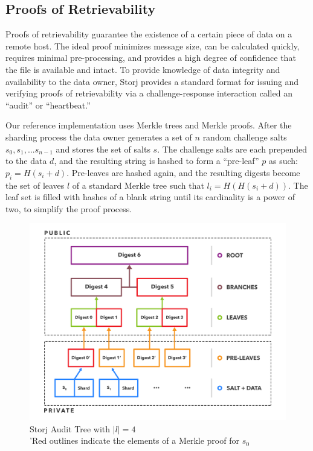\documentclass[a4paper,10pt]{article}
\begin{document}
\subsection{Proofs of Retrievability}
Proofs of retrievability guarantee the existence of a certain piece of data on a remote host. The ideal proof minimizes message size, can be calculated quickly, requires minimal pre-processing, and provides a high degree of confidence that the file is available and intact. To provide knowledge of data integrity and availability to the data owner, Storj provides a standard format for issuing and verifying proofs of retrievability via a challenge-response interaction called an “audit” or “heartbeat.”

Our reference implementation uses Merkle trees \cite{5} and Merkle proofs. After the sharding process the data owner generates a set of $ n $ random challenge salts $ s_{0}, s_{1}, ... s_{n-1} $ and stores the set of salts $ s $. The challenge salts are each prepended to the data $ d $, and the resulting string is hashed to form a “pre-leaf” $ p $ as such: $ p_{i} = H(s_{i} + d) $. Pre-leaves are hashed again, and the resulting digests become the set of leaves $ l $ of a standard Merkle tree such that $ l_{i} = H(H(s_{i} + d)) $. The leaf set is filled with hashes of a blank string until its cardinality is a power of two, to simplify the proof process.

\begin{figure}[hbt]
\centering
\includegraphics[width=\linewidth]{2}
\caption{Storj Audit Tree with $ |l| = 4 $\\'Red outlines indicate the elements of a Merkle proof for $ s_{0} $}
\end{figure}
\end{document}
